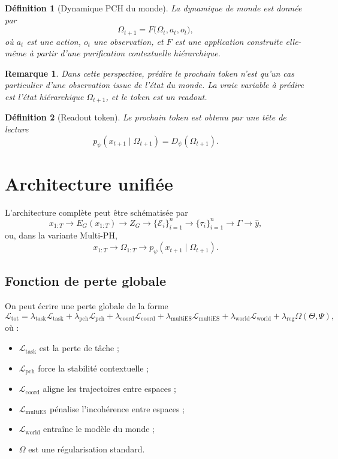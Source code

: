 \documentclass[11pt,a4paper]{article}
\newtheorem{definition}{Définition}[section]
\newtheorem{remark}{Remarque}[section]
\newcommand{\E}{\mathcal E}
\newcommand{\1}{\mathbf 1}
\begin{document}
\begin{definition}[Dynamique PCH du monde]
La dynamique de monde est donnée par
\[
\Omega_{t+1}
=
F\!\bigl(\Omega_t,a_t,o_t\bigr),
\]
où \(a_t\) est une action, \(o_t\) une observation, et \(F\) est une application construite elle-même à partir d'une purification contextuelle hiérarchique.
\end{definition}

\begin{remark}
Dans cette perspective, prédire le prochain token n'est qu'un cas particulier d'une observation issue de l'état du monde.
La vraie variable à prédire est l'état hiérarchique \(\Omega_{t+1}\), et le token est un readout.
\end{remark}

\begin{definition}[Readout token]
Le prochain token est obtenu par une tête de lecture
\[
p_\psi(x_{t+1}\mid \Omega_{t+1})
=
D_\psi(\Omega_{t+1}).
\]
\end{definition}

\section{Architecture unifiée}

L'architecture complète peut être schématisée par
\[
x_{1:T}
\longrightarrow
E_G(x_{1:T})
\longrightarrow
Z_G
\longrightarrow
\{\E_i\}_{i=1}^n
\longrightarrow
\{\tau_i\}_{i=1}^n
\longrightarrow
\Gamma
\longrightarrow
\hat y,
\]
ou, dans la variante Multi-PH,
\[
x_{1:T}
\longrightarrow
\Omega_{1:T}
\longrightarrow
p_\psi(x_{t+1}\mid \Omega_{t+1}).
\]

\subsection{Fonction de perte globale}

On peut écrire une perte globale de la forme
\[
\mathcal L_{\mathrm{tot}}
=
\lambda_{\mathrm{task}}\mathcal L_{\mathrm{task}}
+
\lambda_{\mathrm{pch}}\mathcal L_{\mathrm{pch}}
+
\lambda_{\mathrm{coord}}\mathcal L_{\mathrm{coord}}
+
\lambda_{\mathrm{multiES}}\mathcal L_{\mathrm{multiES}}
+
\lambda_{\mathrm{world}}\mathcal L_{\mathrm{world}}
+
\lambda_{\mathrm{reg}}\Omega(\Theta,\Psi),
\]
où :
\begin{itemize}[leftmargin=2em]
    \item \(\mathcal L_{\mathrm{task}}\) est la perte de tâche ;
    \item \(\mathcal L_{\mathrm{pch}}\) force la stabilité contextuelle ;
    \item \(\mathcal L_{\mathrm{coord}}\) aligne les trajectoires entre espaces ;
    \item \(\mathcal L_{\mathrm{multiES}}\) pénalise l'incohérence entre espaces ;
    \item \(\mathcal L_{\mathrm{world}}\) entraîne le modèle du monde ;
    \item \(\Omega\) est une régularisation standard.
\end{itemize}
\end{document}
